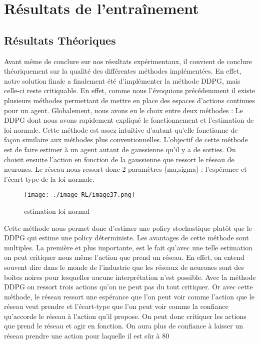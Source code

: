 \section{Résultats de l'entraînement}

\subsection{Résultats Théoriques}
Avant même de conclure sur nos résultats expérimentaux, il convient de conclure théoriquement sur la qualité des différentes méthodes implémentées.
En effet, notre solution finale a finalement été d’implémenter la méthode DDPG, mais celle-ci reste critiquable.
En effet, comme nous l’évoquions précédemment il existe plusieurs méthodes permettant de mettre en place des espaces d’actions continues pour un agent.
Globalement, nous avons eu le choix entre deux méthodes : 
Le DDPG dont nous avons rapidement expliqué le fonctionnement et l’estimation de loi normale.
Cette méthode est assez intuitive d’autant qu’elle fonctionne de façon similaire aux méthodes plus conventionnelles.
L’objectif de cette méthode est de faire estimer à un agent autant de gaussienne qu’il y a de sorties.
On choisit ensuite l’action en fonction de la gaussienne que ressort le réseau de neurones.
Le réseau nous ressort donc 2 paramètres (mu,sigma) : l'espérance et l'écart-type de la loi normale.
\begin{figure}[H]
    \centering
    \texttt{[image: ./image\_RL/image37.png]}
    \caption{  estimation loi normal  }
\end{figure}
Cette méthode nous permet donc d’estimer une policy stochastique plutôt que le DDPG qui estime une policy déterministe. 
Les avantages de cette méthode sont multiples.
La première et plus importante, est le fait qu’avec une telle estimation on peut critiquer nous même l’action que prend un réseau.
En effet, on entend souvent dire dans le monde de l’industrie que les réseaux de neurones sont des boîtes noires pour lesquelles aucune interprétation n’est possible.
Avec la méthode DDPG on ressort trois actions qu’on ne peut pas du tout critiquer. 
Or avec cette méthode, le réseau ressort une espérance que l’on peut voir comme l’action que le réseau veut prendre et l’écart-type que l’on peut voir comme la confiance qu’accorde le réseau à l’action qu’il propose. On peut donc critiquer les actions que prend le réseau et agir en fonction. On aura plus de confiance à laisser un réseau prendre une action pour laquelle il est sûr à 80%

